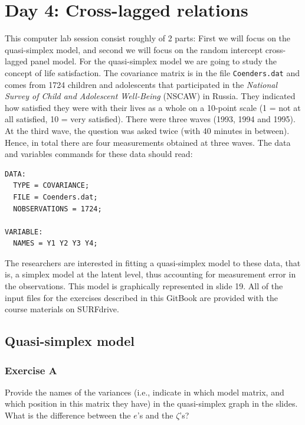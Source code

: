\documentclass[
]{book}
\begin{document}
\hypertarget{day-4-cross-lagged-relations}{%
\chapter{Day 4: Cross-lagged relations}\label{day-4-cross-lagged-relations}}

This computer lab session consist roughly of 2 parts: First we will focus on the quasi-simplex model, and second we will focus on the random intercept cross-lagged panel model. For the quasi-simplex model we are going to study the concept of life satisfaction. The covariance matrix is in the file \texttt{Coenders.dat} and comes from 1724 children and adolescents that participated in the \emph{National Survey of Child and Adolescent Well-Being} (NSCAW) in Russia. They indicated how satisfied they were with their lives as a whole on a 10-point scale (1 = not at all satisfied, 10 = very satisfied). There were three waves (1993, 1994 and 1995). At the third wave, the question was asked twice (with 40 minutes in between). Hence, in total there are four measurements obtained at three waves. The data and variables commands for these data should read:

\begin{verbatim}
DATA: 
  TYPE = COVARIANCE;
  FILE = Coenders.dat;
  NOBSERVATIONS = 1724;

VARIABLE: 
  NAMES = Y1 Y2 Y3 Y4;
\end{verbatim}

The researchers are interested in fitting a quasi-simplex model to these data, that is, a simplex model at the latent level, thus accounting for measurement error in the observations. This model is graphically represented in slide 19. All of the input files for the exercises described in this GitBook are provided with the course materials on SURFdrive.

\hypertarget{quasi-simplex-model}{%
\section{Quasi-simplex model}\label{quasi-simplex-model}}

\hypertarget{exercise-a}{%
\subsection{Exercise A}\label{exercise-a}}

Provide the names of the variances (i.e., indicate in which model matrix, and which position in this matrix they have) in the quasi-simplex graph in the slides. What is the difference between the \(e\)'s and the \(\zeta\)'s?
\end{document}
